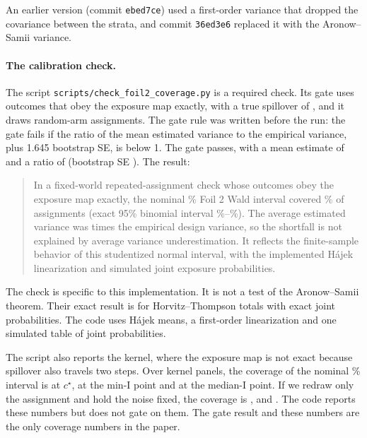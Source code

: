\documentclass[11pt]{article}
\begin{document}
An earlier version (commit \texttt{ebed7ce}) used a first-order variance that dropped
the covariance between the strata, and commit \texttt{36ed3e6} replaced it with the
Aronow--Samii variance.

\paragraph{The calibration check.}
The script \texttt{scripts/check\_foil2\_coverage.py} is a required check. Its gate uses outcomes that obey the
exposure map exactly, with a true spillover of \GateTruth, and it draws
\GateAssignments{} random-arm assignments. The gate rule was written
before the run: the gate fails if the ratio of the mean estimated
variance to the empirical variance, plus 1.645 bootstrap SE, is below 1.
The gate passes, with a mean estimate of \GateMeanEstimate{} and a ratio
of \GateRatio{} (bootstrap SE \GateRatioBootSE). The result:

\begin{quote}
In a fixed-world repeated-assignment check whose outcomes obey the
exposure map exactly, the nominal \ConfidencePct\% Foil 2 Wald interval covered
\GateCoveragePct\% of assignments (exact 95\% binomial interval \GateCoverageLoPct\%--\GateCoverageHiPct\%). The
average estimated variance was \GateRatio{} times the empirical design
variance, so the shortfall is not explained by average variance
underestimation. It reflects the finite-sample behavior of this
studentized normal interval, with the implemented Hájek linearization
and simulated joint exposure probabilities.
\end{quote}
The check is specific to this implementation. It is not a test of the
Aronow--Samii theorem. Their exact result is for Horvitz--Thompson
totals with exact joint probabilities. The code uses Hájek means, a
first-order linearization and one simulated table of joint
probabilities.

The script also reports the kernel, where the exposure map is not
exact because spillover also travels two steps. Over \CheckPanels{} kernel panels,
the coverage of the nominal \ConfidencePct\% interval is \KernelCovStar{} at $c^\star$, \KernelCovMinI{}
at the min-I point and \KernelCovMedI{} at the median-I point. If we redraw only
the assignment and hold the noise fixed, the coverage is \DesignCovStar, \DesignCovMinI{}
and \DesignCovMedI. The code reports these numbers but does not gate on them.
The gate result and these numbers are the only coverage numbers in the paper.
\end{document}

